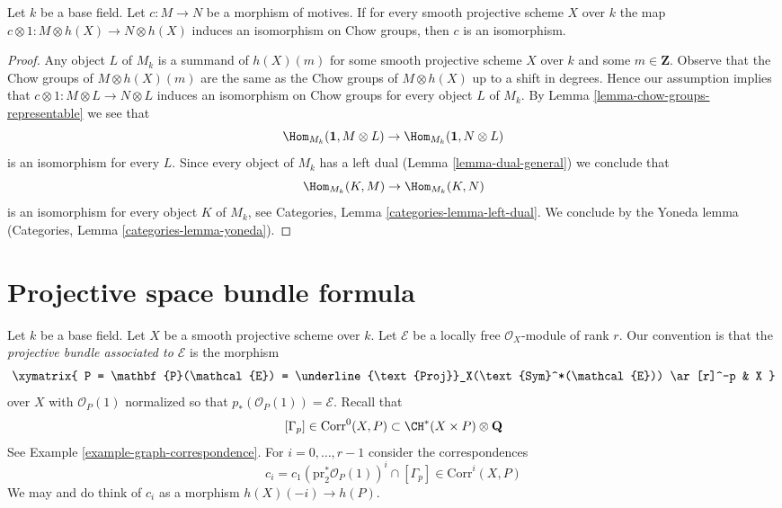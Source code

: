 \begin{lemma}[Manin]
\label{lemma-manin}
Let $k$ be a base field. Let $c : M \to N$ be a morphism of motives.
If for every smooth projective scheme $X$ over $k$ the map
$c \otimes 1 : M \otimes h(X) \to N \otimes h(X)$ induces an isomorphism on
Chow groups, then $c$ is an isomorphism.
\end{lemma}

\begin{proof}
Any object $L$ of $M_k$ is a summand of $h(X)(m)$ for some smooth projective
scheme $X$ over $k$ and some $m \in \mathbf{Z}$. Observe that the Chow groups
of $M \otimes h(X)(m)$ are the same as the Chow groups of $M \otimes h(X)$
up to a shift in degrees. Hence our assumption implies
that $c \otimes 1 : M \otimes L \to N \otimes L$ induces an isomorphism on
Chow groups for every object $L$ of $M_k$. By
Lemma \ref{lemma-chow-groups-representable}
we see that
$$
\Hom_{M_k}(\mathbf{1}, M \otimes L) \to
\Hom_{M_k}(\mathbf{1}, N \otimes L)
$$
is an isomorphism for every $L$. Since every object of $M_k$ has a left dual
(Lemma \ref{lemma-dual-general}) we conclude that
$$
\Hom_{M_k}(K, M) \to \Hom_{M_k}(K, N)
$$
is an isomorphism for every object $K$ of $M_k$, see
Categories, Lemma \ref{categories-lemma-left-dual}.
We conclude by the Yoneda lemma
(Categories, Lemma \ref{categories-lemma-yoneda}).
\end{proof}




\section{Projective space bundle formula}
\label{section-projective-space-bundle}

\noindent
Let $k$ be a base field. Let $X$ be a smooth projective scheme over $k$.
Let $\mathcal{E}$ be a locally free $\mathcal{O}_X$-module of rank $r$.
Our convention is that the {\it projective bundle associated to
$\mathcal{E}$} is the morphism
$$
\xymatrix{
P = \mathbf{P}(\mathcal{E}) =
\underline{\text{Proj}}_X(\text{Sym}^*(\mathcal{E}))
\ar[r]^-p
& X
}
$$
over $X$ with $\mathcal{O}_P(1)$ normalized so that
$p_*(\mathcal{O}_P(1)) = \mathcal{E}$. Recall that
$$
[\Gamma_p] \in \text{Corr}^0(X, P) \subset \CH^*(X \times P) \otimes \mathbf{Q}
$$
See Example \ref{example-graph-correspondence}.
For $i = 0, \ldots, r - 1$ consider the correspondences
$$
c_i = c_1(\text{pr}_2^*\mathcal{O}_P(1))^i \cap [\Gamma_p]
\in \text{Corr}^i(X, P)
$$
We may and do think of $c_i$ as a morphism $h(X)(-i) \to h(P)$.

